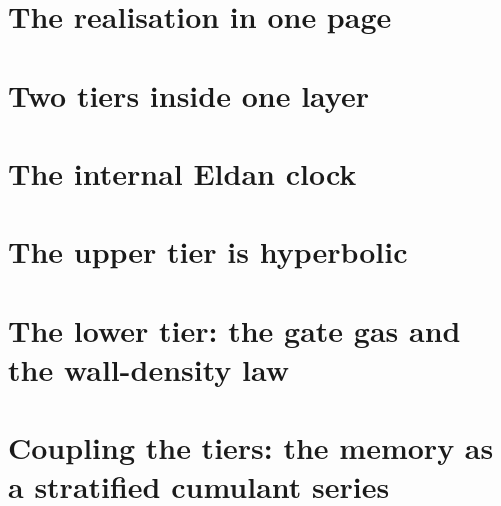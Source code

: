 \documentclass[11pt]{article}
\theoremstyle{plain}
\theoremstyle{definition}\newtheorem{definition}[theorem]{Definition}\newtheorem{remark}[theorem]{Remark}
\begin{document}
\begin{abstract}
couplings are $c_{ab}\varphi(r_a)\varphi(r_b)/(p_aq_ap_bq_b)$, with a Mattis component whose stored pattern is the field itself.
Every wall-localized one-body quantity obeys a \emph{wall-density law}: it equals $(\int Q)\sin(\theta/2)/\sqrt\pi$, so it decays
harmonically in Fatou time and its total over depth grows like $\log\tau$. (v)~\emph{Tier coupling.} At every layer an exact Euler
split writes the mean as an upper-tier term plus a gate--field covariance. The non-Gaussian corrections form an Edgeworth series. We
prove that each Edgeworth term is a sum over strata of the wall arrangement, and that the joint cumulant entering a stratum is that
of exactly the fields whose walls meet there: the Kikuchi level equals the codimension. Normal crossings carry nothing. Two-body
memory lives only on the bent crossings, where stage 11 found the non-abelian isotropy $\aff(1)$. (vi)~\emph{Modular structure.}
The layer's Gaussian state is a KMS state on the fibre relation of $h_l$. Its extremal decomposition is the law of $h_l$, its
conditional expectation onto the centre is the posterior, and the centres form a decreasing tower. The forward state localizes
while the backward (sensitivity) state delocalizes with the power law $(\tau_l/\tau_L)^3$. Every claim is labelled as proved, proved
at infinite width, conjectural or an analogy. The identities are checked by \texttt{scripts/verify\_stage12.py}.
\end{abstract}
\tableofcontents
\section{The realisation in one page}

\section{Two tiers inside one layer}

\section{The internal Eldan clock}

\section{The upper tier is hyperbolic}

\section{The lower tier: the gate gas and the wall-density law}

\section{Coupling the tiers: the memory as a stratified cumulant series}

\end{document}
